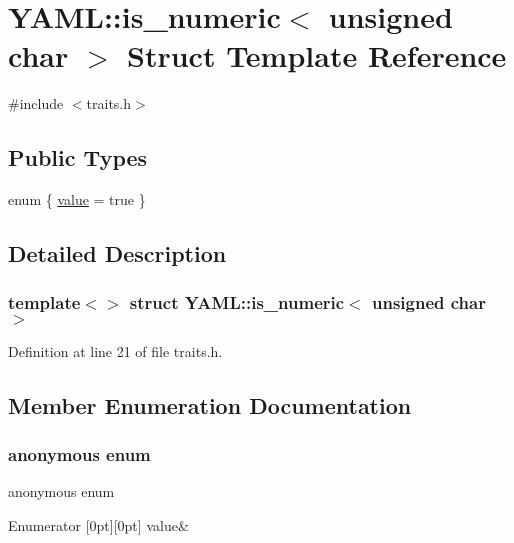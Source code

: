 \hypertarget{struct_y_a_m_l_1_1is__numeric_3_01unsigned_01char_01_4}{}\section{Y\+A\+ML\+::is\+\_\+numeric$<$ unsigned char $>$ Struct Template Reference}
\label{struct_y_a_m_l_1_1is__numeric_3_01unsigned_01char_01_4}


{\ttfamily \#include $<$traits.\+h$>$}

\subsection*{Public Types}
\begin{DoxyCompactItemize}
\item 
enum \{ \mbox{\hyperlink{struct_y_a_m_l_1_1is__numeric_3_01unsigned_01char_01_4_ae46f18731a09fa55dd9a4108c741bde8a7d316be37e7c1e68928b74df047a96a7}{value}} = true
 \}
\end{DoxyCompactItemize}


\subsection{Detailed Description}
\subsubsection*{template$<$$>$\newline
struct Y\+A\+M\+L\+::is\+\_\+numeric$<$ unsigned char $>$}



Definition at line 21 of file traits.\+h.



\subsection{Member Enumeration Documentation}
\mbox{\label{struct_y_a_m_l_1_1is__numeric_3_01unsigned_01char_01_4_ae46f18731a09fa55dd9a4108c741bde8}} 
\subsubsection{\texorpdfstring{anonymous enum}{anonymous enum}}
{\footnotesize\ttfamily anonymous enum}

\begin{DoxyEnumFields}{Enumerator}
[0pt][0pt]{}\mbox{\label{struct_y_a_m_l_1_1is__numeric_3_01unsigned_01char_01_4_ae46f18731a09fa55dd9a4108c741bde8a7d316be37e7c1e68928b74df047a96a7}} 
value&\\
\hline

\end{DoxyEnumFields}


